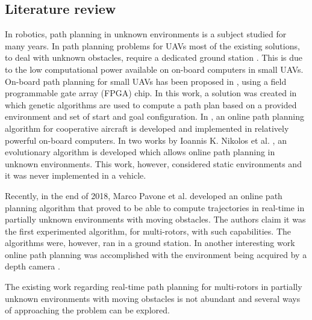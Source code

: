 \subsection{Literature review}
In robotics, path planning in unknown environments is a subject studied for many years. In path planning problems for UAVs most of the existing solutions, to deal with unknown obstacles, require a dedicated ground station \cite{angelov:saa} \cite{ref:LOWAS} . This is due to the low computational power available on on-board computers in small UAVs. On-board path planning for small UAVs has been proposed in \cite{ref:FPGA}, using a field programmable gate array (FPGA) chip. In this work, a solution was created in which genetic algorithms are used to compute a path plan based on a provided environment and set of start and goal configuration. In \cite{ref:coopOnBoard}, an online path planning algorithm for cooperative aircraft is developed and implemented in relatively powerful on-board computers. In two works by Ioannis K. Nikolos et al. \cite{ref:onlineEvolutionary} \cite{ref:onlineEvolutionary2}, an evolutionary algorithm is developed which allows online path planning in unknown environments. This work, however, considered static environments and it was never implemented in a vehicle.
\par
Recently, in the end of 2018, Marco Pavone et al. \cite{ref:quad} developed an online path planning algorithm that proved to be able to compute trajectories in real-time in partially unknown environments with moving obstacles. The authors claim it was the first experimented algorithm, for multi-rotors, with such capabilities. The algorithms were, however, ran in a ground station. In another interesting work online path planning was accomplished with the environment being acquired by a depth camera \cite{ETH}.
\par
The existing work regarding real-time path planning for multi-rotors in partially unknown environments with moving obstacles is not abundant and several ways of approaching the problem can be explored.

